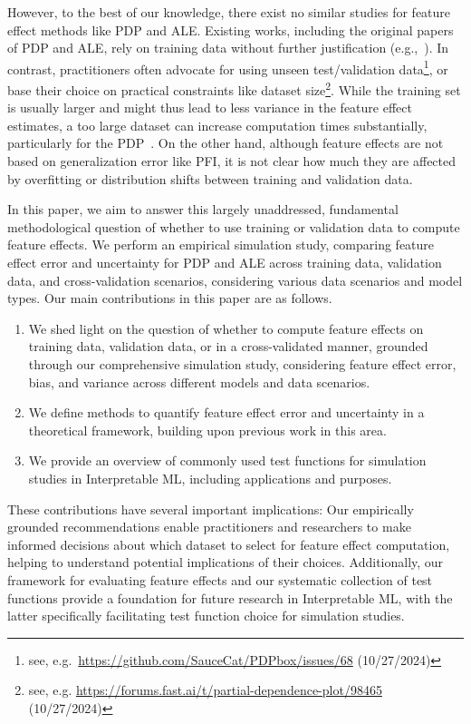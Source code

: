 \documentclass[runningheads]{llncs}
\begin{document}
However, to the best of our knowledge, there exist no similar studies for
feature effect methods like PDP and ALE. Existing works, including the original
papers of PDP and ALE, rely on training data without further justification
(e.g.,~\cite{apley_visualizing_2020,friedman_greedy_2001,molnar_interpretable_2022}).
In contrast, practitioners often advocate for using unseen test/validation
data\footnote{see, e.g.\ \url{https://github.com/SauceCat/PDPbox/issues/68}
    (10/27/2024)}, or base their choice on practical constraints like dataset
size\footnote{see, e.g.
    \url{https://forums.fast.ai/t/partial-dependence-plot/98465} (10/27/2024)}.
While the training set is usually larger and might thus lead to less variance
in the feature effect estimates, a too large dataset can increase computation
times substantially, particularly for the PDP~\cite{friedman_greedy_2001}. On
the other hand, although feature effects are not based on generalization error
like PFI, it is not clear how much they are affected by overfitting or
distribution shifts between training and validation data.

In this paper, we aim to answer this largely unaddressed, fundamental
methodological question of whether to use training or validation data to
compute feature effects. We perform an empirical simulation study, comparing
feature effect error and uncertainty for PDP and ALE across training data,
validation data, and cross-validation scenarios, considering various data
scenarios and model types. Our main contributions in this paper are as follows.
\begin{enumerate}
    \item We shed light on the question of whether to compute feature effects on training
          data, validation data, or in a cross-validated manner, grounded through our
          comprehensive simulation study, considering feature effect error, bias, and
          variance across different models and data scenarios.
    \item We define methods to quantify feature effect error and uncertainty in a
          theoretical framework, building upon previous work in this area.
    \item We provide an overview of commonly used test functions for simulation studies
          in Interpretable ML, including applications and purposes.
\end{enumerate}

These contributions have several important implications: Our empirically
grounded recommendations enable practitioners and researchers to make informed
decisions about which dataset to select for feature effect computation, helping
to understand potential implications of their choices. Additionally, our
framework for evaluating feature effects and our systematic collection of test
functions provide a foundation for future research in Interpretable ML, with
the latter specifically facilitating test function choice for simulation
studies.
\end{document}
